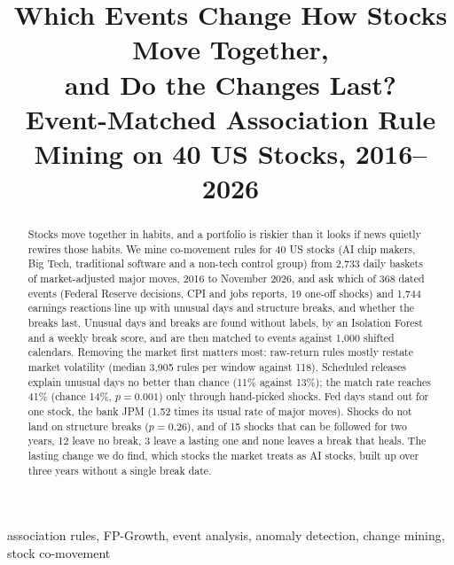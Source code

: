 \documentclass[conference]{IEEEtran}
\begin{document}
\title{Which Events Change How Stocks Move Together,\\ and Do the Changes Last?\\ Event-Matched Association Rule Mining on 40 US Stocks, 2016--2026}

\author{
}

\maketitle

\begin{abstract}
Stocks move together in habits, and a portfolio is riskier than it looks if news quietly rewires those habits. We mine co-movement rules for 40 US stocks (AI chip makers, Big Tech, traditional software and a non-tech control group) from 2,733 daily baskets of market-adjusted major moves, 2016 to November 2026, and ask which of 368 dated events (Federal Reserve decisions, CPI and jobs reports, 19 one-off shocks) and 1,744 earnings reactions line up with unusual days and structure breaks, and whether the breaks last. Unusual days and breaks are found without labels, by an Isolation Forest and a weekly break score, and are then matched to events against 1,000 shifted calendars. Removing the market first matters most: raw-return rules mostly restate market volatility (median 3,905 rules per window against 118). Scheduled releases explain unusual days no better than chance (11\% against 13\%); the match rate reaches 41\% (chance 14\%, $p=0.001$) only through hand-picked shocks. Fed days stand out for one stock, the bank JPM (1.52 times its usual rate of major moves). Shocks do not land on structure breaks ($p=0.26$), and of 15 shocks that can be followed for two years, 12 leave no break, 3 leave a lasting one and none leaves a break that heals. The lasting change we do find, which stocks the market treats as AI stocks, built up over three years without a single break date.
\end{abstract}

\begin{IEEEkeywords}
association rules, FP-Growth, event analysis, anomaly detection, change mining, stock co-movement
\end{IEEEkeywords}
\end{document}
